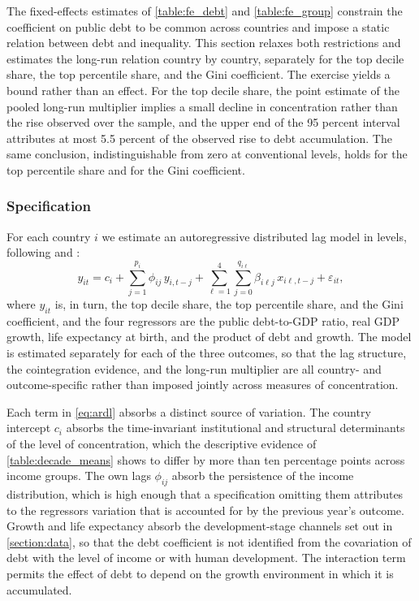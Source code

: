 \documentclass[12pt, titlepage]{article}
\numberwithin{equation}{section}
\begin{document}
The fixed-effects estimates of \autoref{table:fe_debt} and \autoref{table:fe_group}
constrain the coefficient on public debt to be common across countries and
impose a static relation between debt and inequality. This section relaxes
both restrictions and estimates the long-run relation country by country,
separately for the top decile share, the top percentile share, and the Gini
coefficient. The exercise yields a bound rather than an effect. For the top
decile share, the point estimate of the pooled long-run multiplier implies a
small decline in concentration rather than the rise observed over the sample,
and the upper end of the 95 percent interval attributes at most 5.5 percent of
the observed rise to debt accumulation. The same conclusion, indistinguishable
from zero at conventional levels, holds for the top percentile share and for
the Gini coefficient.

\subsubsection{Specification}

For each country $i$ we estimate an autoregressive distributed lag model in
levels, following \cite{PesaranShin1999} and \cite{PesaranShinSmith2001}:
\begin{equation}
	y_{it} = c_{i} + \sum_{j=1}^{p_{i}} \phi_{ij} \, y_{i,t-j}
	+ \sum_{\ell=1}^{4} \sum_{j=0}^{q_{i\ell}} \beta_{i\ell j} \, x_{i\ell,t-j}
	+ \varepsilon_{it},
	\label{eq:ardl}
\end{equation}
where $y_{it}$ is, in turn, the top decile share, the top percentile share,
and the Gini coefficient, and the four regressors are the public debt-to-GDP
ratio, real GDP growth, life expectancy at birth, and the product of debt and
growth. The model is estimated separately for each of the three outcomes, so
that the lag structure, the cointegration evidence, and the long-run
multiplier are all country- and outcome-specific rather than imposed jointly
across measures of concentration.

Each term in \eqref{eq:ardl} absorbs a distinct source of variation. The
country intercept $c_{i}$ absorbs the time-invariant institutional and
structural determinants of the level of concentration, which the descriptive
evidence of \autoref{table:decade_means} shows to differ by more than ten
percentage points across income groups. The own lags $\phi_{ij}$ absorb the
persistence of the income distribution, which is high enough that a
specification omitting them attributes to the regressors variation that is
accounted for by the previous year's outcome. Growth and life expectancy absorb
the development-stage channels set out in \autoref{section:data}, so that the
debt coefficient is not identified from the covariation of debt with the level
of income or with human development. The interaction term permits the effect
of debt to depend on the growth environment in which it is accumulated.
\end{document}
